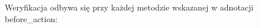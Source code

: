 Weryfikacja odbywa się przy każdej metodzie wskazanej w adnotacji before\_action:\\
\begin{minipage}{\linewidth}
\label{before_authorization}
\end{minipage}
